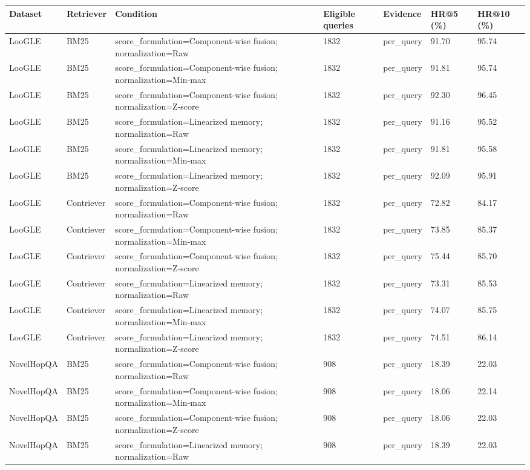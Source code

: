 \begin{tabular}{lllllll}
\hline
Dataset & Retriever & Condition & Eligible queries & Evidence & HR@5 (\%) & HR@10 (\%) \\
\hline
LooGLE & BM25 & score\_formulation=Component-wise fusion; normalization=Raw & 1832 & per\_query & 91.70 & 95.74 \\
LooGLE & BM25 & score\_formulation=Component-wise fusion; normalization=Min-max & 1832 & per\_query & 91.81 & 95.74 \\
LooGLE & BM25 & score\_formulation=Component-wise fusion; normalization=Z-score & 1832 & per\_query & 92.30 & 96.45 \\
LooGLE & BM25 & score\_formulation=Linearized memory; normalization=Raw & 1832 & per\_query & 91.16 & 95.52 \\
LooGLE & BM25 & score\_formulation=Linearized memory; normalization=Min-max & 1832 & per\_query & 91.81 & 95.58 \\
LooGLE & BM25 & score\_formulation=Linearized memory; normalization=Z-score & 1832 & per\_query & 92.09 & 95.91 \\
LooGLE & Contriever & score\_formulation=Component-wise fusion; normalization=Raw & 1832 & per\_query & 72.82 & 84.17 \\
LooGLE & Contriever & score\_formulation=Component-wise fusion; normalization=Min-max & 1832 & per\_query & 73.85 & 85.37 \\
LooGLE & Contriever & score\_formulation=Component-wise fusion; normalization=Z-score & 1832 & per\_query & 75.44 & 85.70 \\
LooGLE & Contriever & score\_formulation=Linearized memory; normalization=Raw & 1832 & per\_query & 73.31 & 85.53 \\
LooGLE & Contriever & score\_formulation=Linearized memory; normalization=Min-max & 1832 & per\_query & 74.07 & 85.75 \\
LooGLE & Contriever & score\_formulation=Linearized memory; normalization=Z-score & 1832 & per\_query & 74.51 & 86.14 \\
NovelHopQA & BM25 & score\_formulation=Component-wise fusion; normalization=Raw & 908 & per\_query & 18.39 & 22.03 \\
NovelHopQA & BM25 & score\_formulation=Component-wise fusion; normalization=Min-max & 908 & per\_query & 18.06 & 22.14 \\
NovelHopQA & BM25 & score\_formulation=Component-wise fusion; normalization=Z-score & 908 & per\_query & 18.06 & 22.03 \\
NovelHopQA & BM25 & score\_formulation=Linearized memory; normalization=Raw & 908 & per\_query & 18.39 & 22.03 \\

\end{tabular}
